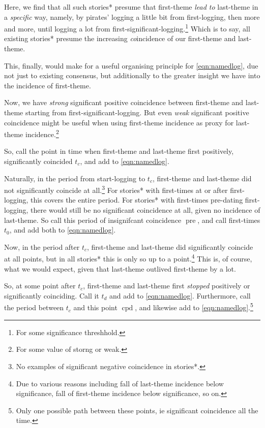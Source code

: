 \documentclass{amsart}
\DeclareMathOperator{\pre}{pre} %
\DeclareMathOperator{\cpd}{cpd} %
\theoremstyle{definition}
\theoremstyle{remark}
\begin{document}
			Here, we find that all such stories* presume that first-theme \emph{lead to} last-theme in a \emph{specific} way, namely, by pirates' logging a little bit from first-logging, then more and more, until logging a lot from first-significant-logging.\footnote{For some significance threshhold.} Which is to say, all existing stories* presume the increasing \emph{co}incidence of our first-theme and last-theme.
			
			This, finally, would make for a useful organising principle for \ref{eqn:namedlog}, due not just to existing consensus, but additionally to the greater insight we have into the incidence of first-theme.
			
			Now, we have \emph{strong} significant positive coincidence between first-theme and last-theme starting from first-significant-logging. But even \emph{weak} significant positive coincidence might be useful when using first-theme incidence as proxy for last-theme incidence.\footnote{For some value of storng or weak.}
			
			So, call the point in time when first-theme and last-theme first positively, significantly coincided \(t_c\), and add to \ref{eqn:namedlog}.
			
			Naturally, in the period from start-logging to \(t_c\), first-theme and last-theme did not significantly coincide at all.\footnote{No examples of significant negative coincidence in stories*.} For stories* with first-times at or after first-logging, this covers the entire period. For stories* with first-times pre-dating first-logging, there would still be no significant coincidence at all, given no incidence of last-theme. So call this period of insignifcant coincidence \(\pre\), and call first-times \(t_0\), and add both to \ref{eqn:namedlog}.
			
			Now, in the period after \(t_c\), first-theme and last-theme did significantly coincide at all points, but in all stories* this is only so up to a point.\footnote{Due to various reasons including fall of last-theme incidence below significance, fall of first-theme incidence below significance, so on.} This is, of course, what we would expect, given that last-theme outlived first-theme by a lot.
			
			So, at some point after \(t_c\), first-theme and last-theme first \emph{stopped} positively or significantly coinciding. Call it \(t_d\) and add to \ref{eqn:namedlog}. Furthermore, call the period between \(t_c\) and this point \(\cpd\), and likewise add to \ref{eqn:namedlog}.\footnote{Only one possible path between these points, ie significant coincidence all the time.}
			
\end{document}
